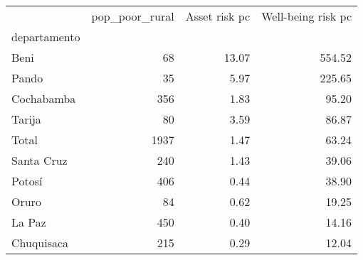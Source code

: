 \begin{tabular}{lrrr}
\toprule
{} &  pop\_poor\_rural &  Asset risk pc &  Well-being risk pc \\
departamento &                 &                &                     \\
\midrule
Beni         &              68 &          13.07 &              554.52 \\
Pando        &              35 &           5.97 &              225.65 \\
Cochabamba   &             356 &           1.83 &               95.20 \\
Tarija       &              80 &           3.59 &               86.87 \\
Total        &            1937 &           1.47 &               63.24 \\
Santa Cruz   &             240 &           1.43 &               39.06 \\
Potosí       &             406 &           0.44 &               38.90 \\
Oruro        &              84 &           0.62 &               19.25 \\
La Paz       &             450 &           0.40 &               14.16 \\
Chuquisaca   &             215 &           0.29 &               12.04 \\
\bottomrule
\end{tabular}
